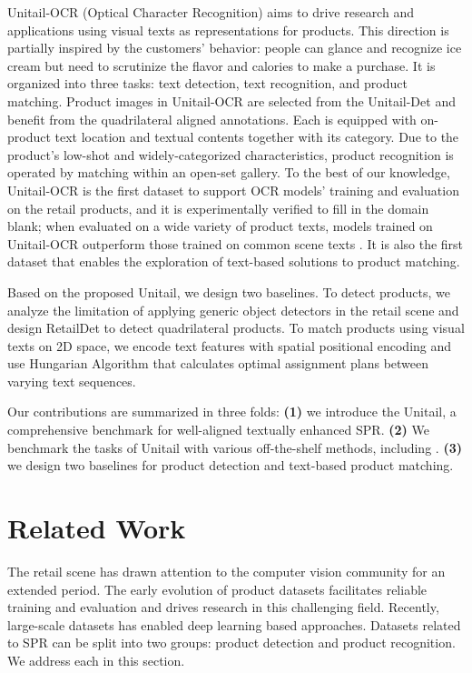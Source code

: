 \documentclass[runningheads]{llncs}
\begin{document}
Unitail-OCR (Optical Character Recognition) aims to drive research and applications using visual texts as representations for products. This direction is partially inspired by the customers' behavior: people can glance and recognize ice cream but need to scrutinize the flavor and calories to make a purchase. It is organized into three tasks: text detection, text recognition, and product matching. Product images in Unitail-OCR are selected from the Unitail-Det and benefit from the quadrilateral aligned annotations. Each is equipped with on-product text location and textual contents together with its category. Due to the product's low-shot and widely-categorized characteristics, product recognition is operated by matching within an open-set gallery. To the best of our knowledge, Unitail-OCR is the first dataset to support OCR models' training and evaluation on the retail products, and it is experimentally verified to fill in the domain blank; when evaluated on a wide variety of product texts, models trained on Unitail-OCR outperform those trained on common scene texts \cite{ICDAR15}. It is also the first dataset that enables the exploration of text-based solutions to product matching.



Based on the proposed Unitail, we design two baselines. To detect products, we analyze the limitation of applying generic object detectors in the retail scene and design RetailDet to detect quadrilateral products. To match products using visual texts on 2D space, we encode text features with spatial positional encoding and use Hungarian Algorithm \cite{hungarian_algorithm} that calculates optimal assignment plans between varying text sequences. 

Our contributions are summarized in three folds: \textbf{(1)} we introduce the Unitail, a comprehensive benchmark for well-aligned textually enhanced SPR. \textbf{(2)} We benchmark the tasks of Unitail with various off-the-shelf methods, including \cite{FCENet2021,PANet2019,PSENet2019,DBNet2020,RIDet,xu2019gliding,RSDet,he2017mask,CRNN,sheng2019nrtr,yue2020robustscanner,li2019SAR,SATRN,fang2021ABINet,densebox,ResNet,efficientnetv2,pan2018IBNNet}. \textbf{(3)} we design two baselines for product detection and text-based product matching. 

\section{Related Work}
The retail scene has drawn attention to the computer vision community for an extended period. The early evolution of product datasets \cite{Grozi-120,SOIL-47,Supermarket2010} facilitates reliable training and evaluation and drives research in this challenging field. Recently, large-scale datasets \cite{AliProduct,SKU110k} has enabled deep learning based approaches. Datasets related to SPR can be split into two groups: product detection and product recognition. We address each in this section. 
\end{document}
